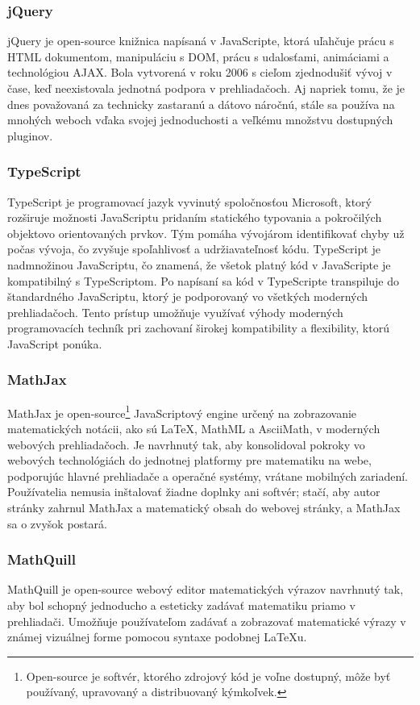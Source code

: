 \subsubsection{jQuery}
jQuery je open-source knižnica napísaná v JavaScripte, ktorá uľahčuje prácu s HTML dokumentom, manipuláciu s DOM, prácu s udalosťami, animáciami a technológiou AJAX.
 Bola vytvorená v roku 2006 s cieľom zjednodušiť vývoj v čase, keď neexistovala jednotná podpora v prehliadačoch.
  Aj napriek tomu, že je dnes považovaná za technicky zastaranú a dátovo náročnú, stále sa používa na mnohých weboch vďaka svojej jednoduchosti a veľkému množstvu dostupných pluginov.\cite{jquery}


 \subsubsection{TypeScript}
TypeScript je programovací jazyk vyvinutý spoločnosťou Microsoft, ktorý rozširuje možnosti JavaScriptu pridaním statického typovania a pokročilých objektovo orientovaných prvkov.
 Tým pomáha vývojárom identifikovať chyby už počas vývoja, čo zvyšuje spoľahlivosť a udržiavateľnosť kódu.
  TypeScript je nadmnožinou JavaScriptu, čo znamená, že všetok platný kód v JavaScripte je kompatibilný s TypeScriptom.
   Po napísaní sa kód v TypeScripte transpiluje do štandardného JavaScriptu, ktorý je podporovaný vo všetkých moderných prehliadačoch. 
   Tento prístup umožňuje využívať výhody moderných programovacích techník pri zachovaní širokej kompatibility a flexibility, ktorú JavaScript ponúka.\cite{TypeScript} 
\subsubsection{MathJax}
MathJax je open-source\footnote{Open-source je softvér, ktorého zdrojový kód je voľne dostupný, môže byť používaný, upravovaný a distribuovaný kýmkoľvek.} JavaScriptový engine určený na zobrazovanie matematických notácii, ako sú LaTeX, MathML a AsciiMath, v moderných webových prehliadačoch.
Je navrhnutý tak, aby konsolidoval pokroky vo webových technológiách do jednotnej platformy pre matematiku na webe, podporujúc hlavné prehliadače a operačné systémy, vrátane mobilných zariadení.
Používatelia nemusia inštalovať žiadne doplnky ani softvér; stačí, aby autor stránky zahrnul MathJax a matematický obsah do webovej stránky, a MathJax sa o zvyšok postará.\cite{MathJax}


  \subsubsection{MathQuill}
  MathQuill je open-source webový editor matematických výrazov navrhnutý tak, aby bol schopný jednoducho a esteticky zadávať matematiku priamo v prehliadači. 
  Umožňuje používateľom zadávať a zobrazovať matematické výrazy v známej vizuálnej forme pomocou syntaxe podobnej LaTeXu.

